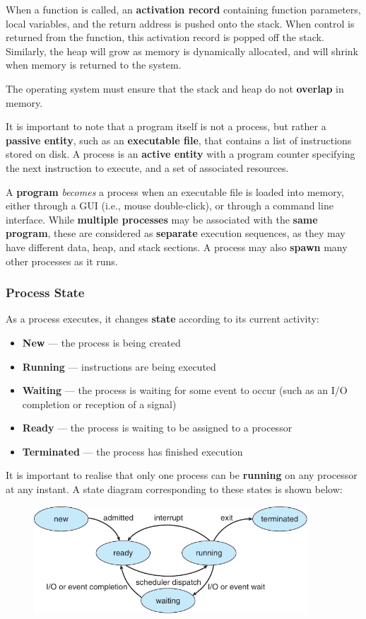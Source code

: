 \documentclass{article}
\begin{document}
When a function is called, an \textbf{activation record} containing
function parameters, local variables, and the return address is pushed
onto the stack. When control is returned from the function, this
activation record is popped off the stack. Similarly, the heap will
grow as memory is dynamically allocated, and will shrink when memory is
returned to the system.

The operating system must ensure that the stack and heap do not
\textbf{overlap} in memory.

It is important to note that a program itself is not a process, but
rather a \textbf{passive entity}, such as an \textbf{executable file},
that contains a list of instructions stored on disk. A process is an
\textbf{active entity} with a program counter specifying the next
instruction to execute, and a set of associated resources.

A \textbf{program} \textit{becomes} a process when an executable file
is loaded into memory, either through a GUI (i.e., mouse double-click),
or through a command line interface. While \textbf{multiple processes}
may be associated with the \textbf{same program}, these are considered
as \textbf{separate} execution sequences, as they may have different
data, heap, and stack sections. A process may also \textbf{spawn} many
other processes as it runs.
\subsubsection{Process State}
As a process executes, it changes \textbf{state} according to its
current activity:
\begin{itemize}
    \item \textbf{New} --- the process is being created
    \item \textbf{Running} --- instructions are being executed
    \item \textbf{Waiting} --- the process is waiting for some event to
          occur (such as an I/O completion or reception of a signal)
    \item \textbf{Ready} --- the process is waiting to be assigned to a
          processor
    \item \textbf{Terminated} --- the process has finished execution
\end{itemize}
It is important to realise that only one
process can be \textbf{running} on any processor at any instant.
A state diagram corresponding to these states is shown below:
\begin{figure}[H]
    \centering
    \includegraphics[height = 4cm]{figures/process_state_diagram.pdf}
\end{figure}
\end{document}
